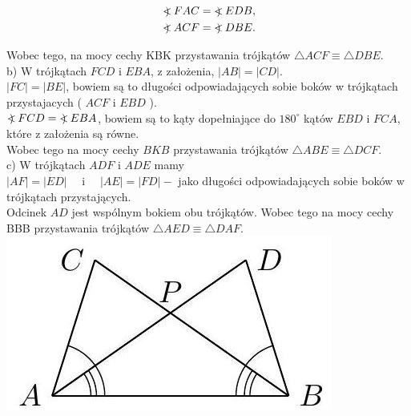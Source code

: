 \documentclass[10pt]{article}
\newcommand\Varangle{\mathop{{<\!\!\!\!\!\text{\small)}}\:}\nolimits}
\begin{document}
\[
\begin{aligned}
& \Varangle F A C=\Varangle E D B, \\
& \Varangle A C F=\Varangle D B E .
\end{aligned}
\]

Wobec tego, na mocy cechy KBK przystawania trójkątów \(\triangle A C F \equiv \triangle D B E\).\\
b) W trójkątach \(F C D\) i \(E B A\), z założenia, \(|A B|=|C D|\).\\
\(|F C|=|B E|\), bowiem są to długości odpowiadających sobie boków w trójkątach przystajacych ( \(A C F\) i \(E B D\) ).\\
\(\Varangle F C D=\Varangle E B A\), bowiem są to kąty dopełniające do \(180^{\circ}\) kątów \(E B D\) i \(F C A\), które z założenia są równe.\\
Wobec tego na mocy cechy \(B K B\) przystawania trójkątów \(\triangle A B E \equiv \triangle D C F\).\\
c) W trójkątach \(A D F\) i \(A D E\) mamy\\
\(|A F|=|E D| \quad\) i \(\quad|A E|=|F D|-\) jako długości odpowiadających sobie boków w trójkątach przystających.\\
Odcinek \(A D\) jest wspólnym bokiem obu trójkątów. Wobec tego na mocy cechy BBB przystawania trójkątów \(\triangle A E D \equiv \triangle D A F\).\\
\includegraphics[max width=\textwidth, center]{2024_11_21_71f62bd117d375398909g-064(1)}
\end{document}
